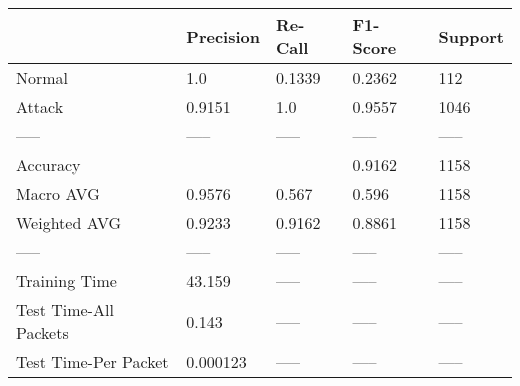 \begin{tabular}{lllll}
\toprule
{} & Precision & Re-Call & F1-Score & Support \\
\midrule
Normal                &       1.0 &  0.1339 &   0.2362 &     112 \\
Attack                &    0.9151 &     1.0 &   0.9557 &    1046 \\
-----                 &     ----- &   ----- &    ----- &   ----- \\
Accuracy              &           &         &   0.9162 &    1158 \\
Macro AVG             &    0.9576 &   0.567 &    0.596 &    1158 \\
Weighted AVG          &    0.9233 &  0.9162 &   0.8861 &    1158 \\
-----                 &     ----- &   ----- &    ----- &   ----- \\
Training Time         &    43.159 &   ----- &    ----- &   ----- \\
Test Time-All Packets &     0.143 &   ----- &    ----- &   ----- \\
Test Time-Per Packet  &  0.000123 &   ----- &    ----- &   ----- \\
\bottomrule
\end{tabular}
